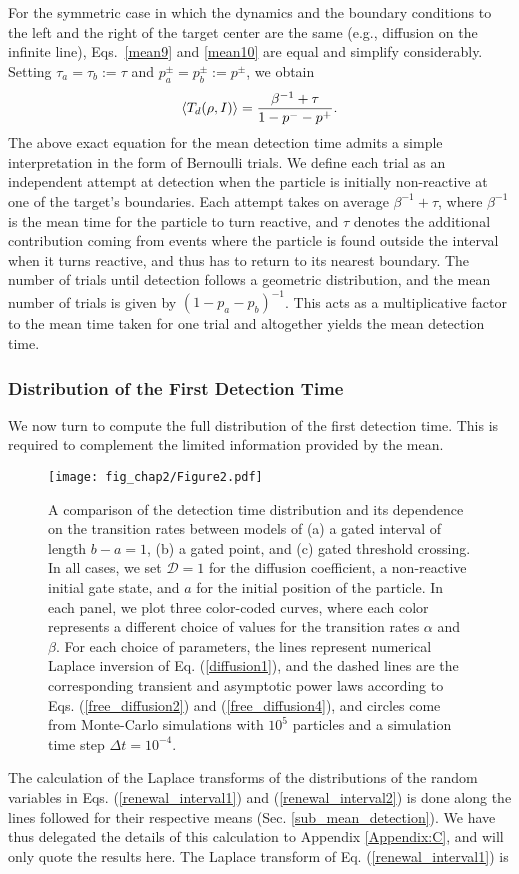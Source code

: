 For the symmetric case in which the dynamics and the boundary conditions to the left and the right of the target center are the same (e.g., diffusion on the infinite line), Eqs.~\eqref{mean9} and \eqref{mean10} are equal and simplify considerably. Setting $\tau_a = \tau_b:=\tau$ and $p^{\pm}_{a} = p^{\pm}_{b}:=p^{\pm}$, we obtain
%
\begin{equation} \label{mean11}
  \Braket{T_d(\rho, I)} = \frac{\beta^{-1} + \tau}{1-p^- - p^+}.
\end{equation}
%
The above exact equation for the mean detection time admits a simple interpretation in the form of Bernoulli trials. We define each trial as an independent attempt at detection when the particle is initially non-reactive at one of the target's boundaries. Each attempt takes on average $\beta^{-1} + \tau$, where $\beta^{-1}$ is the mean time for the particle to turn reactive, and $\tau$ denotes the additional contribution coming from events where the particle is found outside the interval when it turns reactive, and thus has to return to its nearest boundary. The number of trials until detection follows a geometric distribution, and the mean number of trials is given by $(1-p_a-p_b)^{-1}$. This acts as a multiplicative factor to the mean time taken for one trial and altogether yields the mean detection time.    

\subsubsection{Distribution of the First Detection Time}

We now turn to compute the full distribution of the first detection time. This is required to complement the limited information provided by the mean.
\begin{figure}[h]
\centering
\texttt{[image: fig\_chap2/Figure2.pdf]}
\caption{A comparison of the detection time distribution and its dependence on the transition rates between models of (a) a gated interval of length $b-a=1$, (b) a gated point, and (c) gated threshold crossing. In all cases, we set $\mathcal{D}=1$ for the diffusion coefficient, a non-reactive initial gate state, and $a$ for the initial position of the particle. In each panel, we plot three color-coded curves, where each color represents a different choice of values for the transition rates $\alpha$ and $\beta$. For each choice of parameters, the lines represent numerical Laplace inversion of Eq. (\ref{diffusion1}), and the dashed lines are the corresponding transient and asymptotic power laws according to Eqs.  (\ref{free_diffusion2}) and (\ref{free_diffusion4}), and circles come from Monte-Carlo simulations with $10^5$ particles and a simulation time step $\Delta t = 10^{-4}$.}
\label{fig2}
\end{figure} 
The calculation of the Laplace transforms of the distributions of the random variables in Eqs. (\ref{renewal_interval1}) and (\ref{renewal_interval2}) is done along the lines followed for their respective means (Sec. \ref{sub_mean_detection}). We have thus delegated the details of this calculation to Appendix \ref{Appendix:C}, and will only quote the results here. The Laplace transform of Eq. (\ref{renewal_interval1}) is

